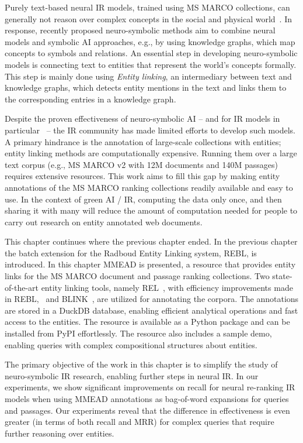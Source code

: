 Purely text-based neural IR models, trained using MS MARCO collections, can generally not reason over complex concepts in the social and physical world~\citep{bosselut2021dynamic, sciavolino:2021:simple}. In response, recently proposed neuro-symbolic methods aim to combine neural models and symbolic AI approaches, e.g., by using knowledge graphs, which map concepts to symbols and relations. An essential step in developing neuro-symbolic models is connecting text to entities that represent the world's concepts formally. This step is mainly done using \textit{Entity linking}, an intermediary between text and knowledge graphs, which detects entity mentions in the text and links them to the corresponding entries in a knowledge graph.

Despite the proven effectiveness of neuro-symbolic AI -- and for IR models in particular~\citep{Tran:2022:DRE, Gerritse:2022:EMBERT, chatterjee2022bert} -- the IR community has made limited efforts to develop such models. A primary hindrance is the annotation of large-scale collections with entities; entity linking methods are computationally expensive. Running them over a large text corpus (e.g., MS MARCO v2 with 12M documents and 140M passages) requires extensive resources. This work aims to fill this gap by making entity annotations of the MS MARCO ranking collections readily available and easy to use. In the context of green AI / IR, computing the data only once, and then sharing it with many will reduce the amount of computation needed for people to carry out research on entity annotated web documents.

This chapter continues where the previous chapter ended. In the previous chapter the batch extension for the Radboud Entity Linking system, REBL, is introduced. In this chapter MMEAD is presented, a resource that provides entity links for the MS MARCO document and passage ranking collections. Two state-of-the-art entity linking tools, namely REL~\citep{rel}, with efficiency improvements made in REBL,~\citep{rebl} and BLINK~\citep{blink}, are utilized for annotating the corpora. The annotations are stored in a DuckDB database, enabling efficient analytical operations and fast access to the entities. The resource is available as a Python package and can be installed from PyPI effortlessly. The resource also includes a sample demo, enabling queries with complex compositional structures about entities. 

The primary objective of the work in this chapter is to simplify the study of neuro-symbolic IR research, enabling further steps in neural IR. In our experiments, we show significant improvements on recall for neural re-ranking IR models when using MMEAD annotations as bag-of-word expansions for queries and passages. Our experiments reveal that the difference in effectiveness is even greater (in terms of both recall and MRR) for complex queries that require further reasoning over entities.

